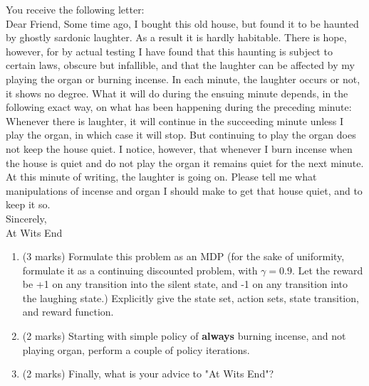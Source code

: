 \documentclass[addpoints,12pt,solution]{exam}
\begin{document}
\begin{questions}
\question[7]You receive the following letter:\\
Dear Friend, Some time ago, I bought this old house, but found it to be haunted by
ghostly sardonic laughter. As a result it is hardly habitable. There is hope, however,
for by actual testing I have found that this haunting is subject to certain laws, obscure
but infallible, and that the laughter can be affected by my playing the organ or burning
incense. In each minute, the laughter occurs or not, it shows no degree. What it will
do during the ensuing minute depends, in the following exact way, on what has been
happening during the preceding minute: Whenever there is laughter, it will continue in
the succeeding minute unless I play the organ, in which case it will stop. But continuing
to play the organ does not keep the house quiet. I notice, however, that whenever I
burn incense when the house is quiet and do not play the organ it remains quiet for the
next minute. At this minute of writing, the laughter is going on. Please tell me what
manipulations of incense and organ I should make to get that house quiet, and to keep
it so.\\
Sincerely,\\
At Wits End
\begin{enumerate}[label=(\alph*)]
    \item (3 marks) Formulate this problem as an MDP (for the sake of uniformity, formulate it as a
continuing discounted problem, with $\gamma= 0.9$. Let the reward be +1 on any transition
into the silent state, and -1 on any transition into the laughing state.) Explicitly give the
state set, action sets, state transition, and reward function.
\begin{solution}
\end{solution}

    \item (2 marks) Starting with simple policy of \textbf{always} burning incense, and not playing organ, perform a couple of policy iterations.
\begin{solution}
\end{solution}
    
    \item (2 marks) Finally, what is your advice to "At Wits End"?
\begin{solution}
\end{solution}
    
    
\end{enumerate}


\end{questions}
\end{document}
